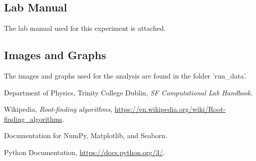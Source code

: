 \documentclass{llncs}
\numberwithin{figure}{section}
\begin{document}
\subsection{Lab Manual}
The lab manual used for this experiment is attached.

\subsection{Images and Graphs}
The images and graphs used for the analysis are found in the folder 'run\_data'.


\vspace{2em}
\begin{thebibliography}{99}
Department of Physics, Trinity College Dublin,
\textit{SF Computational Lab Handbook}.

Wikipedia,
\textit{Root-finding algorithms},
\url{https://en.wikipedia.org/wiki/Root-finding_algorithms}.

Documentation for NumPy, Matplotlib, and Seaborn.

Python Documentation,
\url{https://docs.python.org/3/}.

\end{thebibliography}
\end{document}
